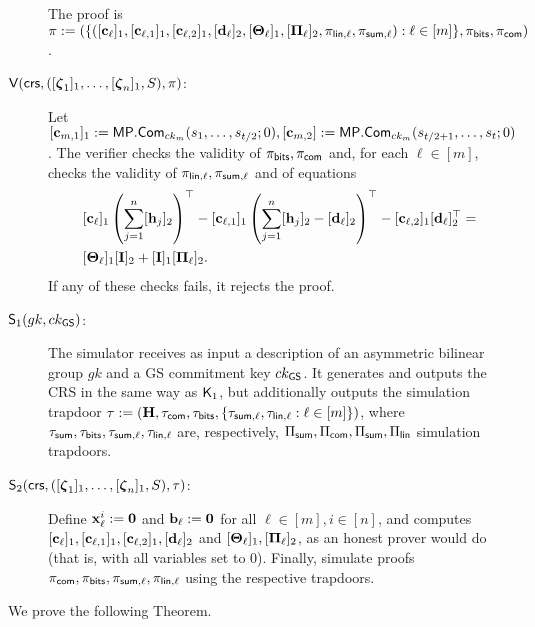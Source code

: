\begin{description}
The proof is \(\pi:=(\{([\mathbf{c}_\ell]_1,[\mathbf{c}_{\ell,1}]_1,[\mathbf{c}_{\ell,2}]_1,[\mathbf{d}_\ell]_2,[\mathbf{{\Theta}}_\ell]_1,[\mathbf{{\Pi}}_\ell]_2,\pi_{\mathsf{lin},\ell},\pi_{\mathsf{sum},\ell}):\ell\in [m]\},\pi_{\mathsf{bits}},\pi_{\mathsf{com}})\).

\item[{\(\mathsf{V}(\mathsf{crs},([{\boldsymbol \zeta}_1]_1, \ldots, [{\boldsymbol \zeta}_n]_1,S),\pi)\)}:]
Let \([\mathbf{c}_{m,1}]_1:=\mathsf{MP}.\mathsf{Com}_{ck_m}(s_1,\ldots,s_{t /2};0),[\mathbf{c}_{m,2}]:=\mathsf{MP}.\mathsf{Com}_{ck_m}(s_{t /2+1},\ldots,s_{t };0)\). The verifier checks the validity of \(\pi_{\mathsf{bits}},\pi_{\mathsf{com}}\) 
and, for each \(\ell\in [m]\), checks the validity of \(\pi_{\mathsf{lin},\ell},\pi_{\mathsf{sum},\ell}\) and of equations
\begin{align}
&[\mathbf{c}_\ell]_1\left(\sum_{j=1}^n [\mathbf{h}_j]_2\right)^\top-
[\mathbf{c}_{\ell,1}]_1\left(\sum_{j=1}^n[\mathbf{h}_j]_2-[\mathbf{d}_\ell]_2\right)^\top-
[\mathbf{c}_{\ell,2}]_1[\mathbf{d}_\ell]_2^\top = \nonumber\\
&[\mathbf{{\Theta}}_\ell]_1[\mathbf{{I}}]_2+[\mathbf{{I}}]_1[\mathbf{{\Pi}}_\ell]_2. \label{eq-alog-5}
\end{align}
If any of these checks fails, it rejects the proof.

\item[{\(\mathsf{S}_1({gk},ck_{\mathsf{GS}})\):}] The simulator receives as input a description of an asymmetric bilinear group \({gk}\) and a GS commitment key $ck_{\mathsf{GS}}$. It generates and outputs the CRS in the same way as \(\mathsf{K}_1\), but additionally outputs the simulation trapdoor 
\(\tau:=(\mathbf{{H}},\tau_{\mathsf{com}},\tau_{\mathsf{bits}},\{\tau_{\mathsf{sum},\ell},\tau_{\mathsf{lin},\ell}:\ell\in [m]\})\),
where \(\tau_{\mathsf{sum}},\tau_{\mathsf{bits}},\tau_{\mathsf{sum},\ell},\tau_{\mathsf{lin,\ell}}\) are, respectively, \({\Pi_{\mathsf{sum}}},{\Pi_{\mathsf{com}}},\Pi_{\mathsf{sum}},\Pi_\mathsf{lin}\) simulation trapdoors.

\item[{\(\mathsf{S}_2(\mathsf{crs},([{\boldsymbol \zeta}_1]_1,\ldots,[{\boldsymbol \zeta}_n]_1,S),\tau)\):}] Define \(\mathbf{x}_\ell^i:=\mathbf{0}\) and \(\mathbf{b}_\ell:=\mathbf{0}\) for all \(\ell\in [m],i\in[n]\), and computes \([\mathbf{c}_\ell]_1, [\mathbf{c}_{\ell,1}]_1,[\mathbf{c}_{\ell,2}]_1,[\mathbf{d}_\ell]_2\) and \([\mathbf{{\Theta}}_\ell]_1,[\mathbf{{\Pi}}_\ell]_2\), as an honest prover would do (that is, with all variables set to 0).
Finally, simulate proofs \(\pi_{\mathsf{com}},\pi_{\mathsf{bits}},\pi_{\mathsf{sum},\ell},\pi_{\mathsf{lin},\ell}\) using the respective trapdoors.
\end{description}

We prove the following Theorem.

